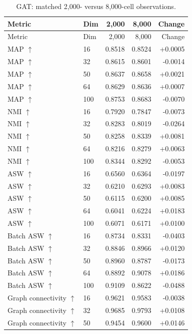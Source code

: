 \documentclass[10pt]{article}
\begin{document}
\begin{landscape}\begin{longtable}{@{}llrrr@{}}
\caption{GAT: matched 2,000- versus 8,000-cell observations.}\\
\toprule Metric & Dim & 2,000 & 8,000 & Change \\\midrule\endfirsthead
\toprule Metric & Dim & 2,000 & 8,000 & Change \\\midrule\endhead
MAP $\uparrow$ & 16 & 0.8518 & 0.8524 & +0.0005 \\
MAP $\uparrow$ & 32 & 0.8615 & 0.8601 & -0.0014 \\
MAP $\uparrow$ & 50 & 0.8637 & 0.8658 & +0.0021 \\
MAP $\uparrow$ & 64 & 0.8629 & 0.8636 & +0.0007 \\
MAP $\uparrow$ & 100 & 0.8753 & 0.8683 & -0.0070 \\
\addlinespace
NMI $\uparrow$ & 16 & 0.7920 & 0.7847 & -0.0073 \\
NMI $\uparrow$ & 32 & 0.8283 & 0.8019 & -0.0264 \\
NMI $\uparrow$ & 50 & 0.8258 & 0.8339 & +0.0081 \\
NMI $\uparrow$ & 64 & 0.8216 & 0.8279 & +0.0063 \\
NMI $\uparrow$ & 100 & 0.8344 & 0.8292 & -0.0053 \\
\addlinespace
ASW $\uparrow$ & 16 & 0.6560 & 0.6364 & -0.0197 \\
ASW $\uparrow$ & 32 & 0.6210 & 0.6293 & +0.0083 \\
ASW $\uparrow$ & 50 & 0.6115 & 0.6200 & +0.0085 \\
ASW $\uparrow$ & 64 & 0.6041 & 0.6224 & +0.0183 \\
ASW $\uparrow$ & 100 & 0.6071 & 0.6171 & +0.0100 \\
\addlinespace
Batch ASW $\uparrow$ & 16 & 0.8734 & 0.8331 & -0.0403 \\
Batch ASW $\uparrow$ & 32 & 0.8846 & 0.8966 & +0.0120 \\
Batch ASW $\uparrow$ & 50 & 0.8960 & 0.8787 & -0.0173 \\
Batch ASW $\uparrow$ & 64 & 0.8892 & 0.9078 & +0.0186 \\
Batch ASW $\uparrow$ & 100 & 0.9109 & 0.8622 & -0.0488 \\
\addlinespace
Graph connectivity $\uparrow$ & 16 & 0.9621 & 0.9583 & -0.0038 \\
Graph connectivity $\uparrow$ & 32 & 0.9685 & 0.9793 & +0.0108 \\
Graph connectivity $\uparrow$ & 50 & 0.9454 & 0.9600 & +0.0146 \\

\end{longtable}
\end{landscape}
\end{document}
